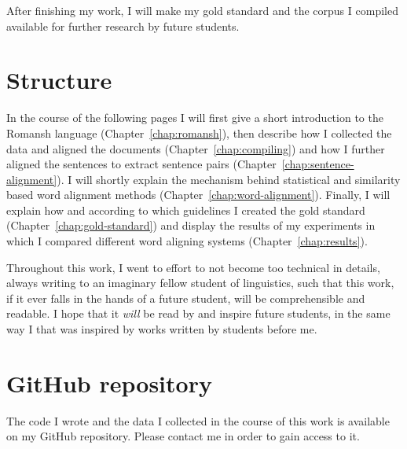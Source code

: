 After finishing my work, I will make my gold standard and the corpus I compiled available for further research by future students.

\section{Structure}
In the course of the following pages I will first give a short introduction to the Romansh language (Chapter~\ref{chap:romansh}), then describe how I collected the data and aligned the documents (Chapter~\ref{chap:compiling}) and how I further aligned the sentences to extract sentence pairs (Chapter~\ref{chap:sentence-alignment}). 
I will shortly explain the mechanism behind statistical and similarity based word alignment methods (Chapter~\ref{chap:word-alignment}). 
Finally, I will explain how and according to which guidelines I created the gold standard (Chapter~\ref{chap:gold-standard}) and display the results of my experiments in which I compared different word aligning systems (Chapter~\ref{chap:results}).

Throughout this work, I went to effort to not become too technical in details, always writing to an imaginary fellow  student of linguistics, such that this work, if it ever falls in the hands of a future student, will be comprehensible and readable. 
I hope that it \emph{will} be read by and inspire future students, in the same way I that was inspired by works written by students before me.

\section{GitHub repository}
The code I wrote and the data I collected in the course of this work is available on my GitHub repository. 
Please contact me in order to gain access to it.


